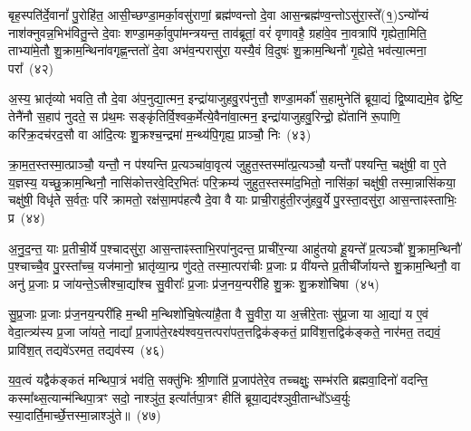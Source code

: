 {\anuvakamend[{म॒नु॒ष्य॒च॒रावु॑दपा॒त्रमु॑प॒ह्वये॑त द्विदेव॒त्याः᳚ षट्च॑त्वारिꣳशच्च}]}

बृह॒स्पति॑र्दे॒वानां᳚ पु॒रोहि॑त॒ आसी॒च्छण्डा॒मर्का॒वसु॑राणां॒ ब्रह्म॑ण्वन्तो दे॒वा आस॒न्ब्रह्म॑ण्व॒न्तो\-ऽसु॑रा॒स्ते᳚(१॒)\-ऽन्यो᳚न्यं नाश॑क्नुवन्न॒भिभ॑वितु॒न्ते दे॒वाः शण्डा॒मर्का॒वुपा॑मन्त्रयन्त॒ ताव॑ब्रूतां॒ वरं॑ वृणावहै॒ ग्रहा॑वे॒व ना॒वत्रापि॑ गृह्येता॒मिति॒ ताभ्या॑मे॒तौ शु॒क्राम॒न्थिना॑वगृह्ण॒न्ततो॑ दे॒वा अभ॑व॒न्परासु॑रा॒ यस्यै॒वं वि॒दुषः॑ शु॒क्राम॒न्थिनौ॑ गृ॒ह्येते॒ भव॑त्या॒त्मना॒ परा᳚~(४२)\ip

अ॒स्य॒ भ्रातृ॑व्यो भवति॒ तौ दे॒वा अ॑प॒नुद्या॒त्मन॒ इन्द्रा॑याजुहवु॒रप॑नुत्तौ॒ शण्डा॒मर्कौ॑ स॒हामुनेति॑ ब्रूया॒द्यं द्वि॒ष्याद्यमे॒व द्वेष्टि॒ तेनै॑नौ स॒हाप॑ नुदते॒ स प्र॑थ॒मः सङ्कृ॑तिर्वि॒श्वक॒र्मेत्ये॒वैना॑वा॒त्मन॒ इन्द्रा॑याजुहवु॒रिन्द्रो॒ ह्ये॑तानि॑ रू॒पाणि॒ करि॑क्र॒दच॑रद॒सौ वा आ॑दि॒त्यः शु॒क्रश्च॒न्द्रमा॑ म॒न्थ्य॑पि॒गृह्य॒ प्राञ्चौ॒ निः~(४३)\ip

क्रा॒म॒त॒स्तस्मा॒त्प्राञ्चौ॒ यन्तौ॒ न प॑श्यन्ति प्र॒त्यञ्चा॑वा॒वृत्य॑ जुहुत॒स्तस्मा᳚त्प्र॒त्यञ्चौ॒ यन्तौ॑ पश्यन्ति॒ चक्षु॑षी॒ वा ए॒ते य॒ज्ञस्य॒ यच्छु॒क्राम॒न्थिनौ॒ नासि॑कोत्तरवे॒दिर॒भितः॑ परि॒क्रम्य॑ जुहुत॒स्तस्मा॑द॒भितो॒ नासि॑कां॒ चक्षु॑षी॒ तस्मा॒न्नासि॑कया॒ चक्षु॑षी॒ विधृ॑ते स॒र्वतः॒ परि॑ क्रामतो॒ रक्ष॑सा॒मप॑हत्यै दे॒वा वै याः प्राची॒राहु॑ती॒रजु॑हवु॒र्ये पु॒रस्ता॒दसु॑रा॒ आस॒न्ताꣴस्ताभिः॒ प्र~(४४)\ip

अ॒नु॒द॒न्त॒ याः प्र॒तीची॒र्ये प॒श्चादसु॑रा॒ आस॒न्ताꣴस्ताभि॒रपा॑नुदन्त॒ प्राची॑र॒न्या आहु॑तयो हू॒यन्ते᳚ प्र॒त्यञ्चौ॑ शु॒क्राम॒न्थिनौ॑ प॒श्चाच्चै॒व पु॒रस्ता᳚च्च॒ यज॑मानो॒ भ्रातृ॑व्या॒न्प्र णु॑दते॒ तस्मा॒त्परा॑चीः प्र॒जाः प्र वी॑यन्ते प्र॒तीची᳚र्जायन्ते शु॒क्राम॒न्थिनौ॒ वा अनु॑ प्र॒जाः प्र जा॑यन्ते॒\-ऽत्त्रीश्चा॒द्या᳚श्च सु॒वीराः᳚ प्र॒जाः प्र॑ज॒नय॒न्परी॑हि शु॒क्रः शु॒क्रशो॑चिषा~(४५)\ip

सु॒प्र॒जाः प्र॒जाः प्र॑ज॒नय॒न्परी॑हि म॒न्थी म॒न्थिशो॑चि॒षेत्या॑है॒ता वै सु॒वीरा॒ या अ॒त्त्रीरे॒ताः सु॑प्र॒जा या आ॒द्या॑ य ए॒वं वेदा॒त्त्र्य॑स्य प्र॒जा जा॑यते॒ नाद्या᳚ प्र॒जा\-प॑ते॒रक्ष्य॑श्वय॒त्तत्परा॑पत॒त्तद्विक॑ङ्कतं॒ प्रावि॑श॒त्तद्विक॑ङ्कते॒ नार॑मत॒ तद्यवं॒ प्रावि॑श॒त् तद्यवे॑\-ऽरमत॒ तद्यव॑स्य~(४६)\ip

य॒व॒त्वं यद्वैक॑ङ्कतं मन्थिपा॒त्रं भव॑ति॒ सक्तु॑भिः श्री॒णाति॑ प्र॒जा\-प॑तेरे॒व तच्चक्षुः॒ सम्भ॑रति ब्रह्मवा॒दिनो॑ वदन्ति॒ कस्मा᳚थ्स॒त्यान्म॑न्थिपा॒त्रꣳ सदो॒ नाश्ञु॑त॒ इत्या᳚र्तपा॒त्रꣳ हीति॑ ब्रूया॒द्यद॑श्ञुवी॒तान्धो᳚\-ऽध्व॒र्युः स्या॒दार्ति॒मार्च्छे॒त्तस्मा॒न्नाश्ञु॑ते॥~(४७)\ip

{\anuvakamend[{आ॒त्मना॒ परा॒ निष्प्र शु॒क्रशो॑चिषा॒ यव॑स्य स॒प्तत्रिꣳ॑शच्च}]}%

